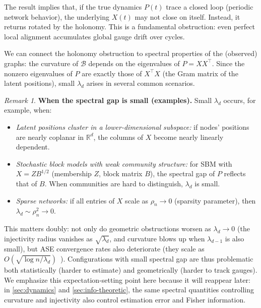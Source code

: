 \documentclass{article}
\newcommand{\RR}{\mathbb{R}}
\theoremstyle{plain}
\theoremstyle{definition}
\theoremstyle{remark}
\newtheorem*{remark}{Remark}
\begin{document}
The result implies that, if the true dynamics $P(t)$ trace a closed loop (periodic network behavior), the underlying $X(t)$ may not close on itself. Instead, it returns rotated by the holonomy.
This is a fundamental obstruction: even perfect local alignment accumulates global gauge drift over cycles.

We can connect the holonomy obstruction to spectral properties of the (observed) graphs: the curvature of $\mathcal{B}$ depends on the eigenvalues of $P = X X^\top$. Since the nonzero eigenvalues of $P$ are exactly those of $X^\top X$ (the Gram matrix of the latent positions), small $\lambda_d$ arises in several common scenarios.

\begin{remark}
\textbf{When the spectral gap is small (examples).} Small $\lambda_d$ occurs, for example, when:
\begin{itemize}
\item \emph{Latent positions cluster in a lower-dimensional subspace:} if nodes' positions are nearly coplanar in $\RR^d$, the columns of $X$ become nearly linearly dependent.
\item \emph{Stochastic block models with weak community structure:} for SBM with $X = Z B^{1/2}$ (membership $Z$, block matrix $B$), the spectral gap of $P$ reflects that of $B$. When communities are hard to distinguish, $\lambda_d$ is small.
\item \emph{Sparse networks:} if all entries of $X$ scale as $\rho_n \to 0$ (sparsity parameter), then $\lambda_d \sim \rho_n^2 \to 0$.
\end{itemize}
\end{remark}

This matters doubly: not only do geometric obstructions worsen as $\lambda_d \to 0$ (the injectivity radius vanishes as $\sqrt{\lambda_d}$, and curvature blows up when $\lambda_{d-1}$ is also small), but ASE convergence rates also deteriorate (they scale as $O(\sqrt{\log n / \lambda_d})$~\citep{cape2019two}).
Configurations with small spectral gap are thus problematic both statistically (harder to estimate) and geometrically (harder to track gauges). We emphasize this expectation-setting point here because it will reappear later: in \cref{sec:dynamics} and \cref{sec:info-theoretic}, the same spectral quantities controlling curvature and injectivity also control estimation error and Fisher information.
\end{document}
